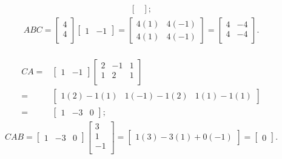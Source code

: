\documentclass[12pt]{article}
\begin{document}
\begin{enumerate}
\begin{align*}
\begin{bmatrix}
      \end{bmatrix};
    \end{align*}
    \begin{align*}
      ABC =
      \begin{bmatrix}
        4\\
        4\\
      \end{bmatrix}
      \begin{bmatrix}
        1 & -1
      \end{bmatrix}
      =
      \begin{bmatrix}
        4(1) & 4(-1)\\
        4(1) & 4(-1)
      \end{bmatrix}
      =
      \begin{bmatrix}
        4 & -4\\
        4 & -4\\
      \end{bmatrix}.
    \end{align*}\\
    \begin{align*}
      CA =&
      \begin{bmatrix}
        1 & -1
      \end{bmatrix}
      \begin{bmatrix}
        2 & -1 & 1\\
        1 &  2 & 1\\
      \end{bmatrix}\\
      =&
      \begin{bmatrix}
        1(2) - 1(1) & 1(-1) - 1(2) & 1(1) - 1(1)
      \end{bmatrix}\\
      =&
      \begin{bmatrix}
        1 & -3 & 0
      \end{bmatrix};
    \end{align*}
    \begin{align*}
      CAB =
      \begin{bmatrix}
        1 & -3 & 0
      \end{bmatrix}
      \begin{bmatrix}
         3\\
         1\\
        -1\\
      \end{bmatrix}
      =
      \begin{bmatrix}
        1(3) - 3(1) + 0(-1)
      \end{bmatrix}
      =
      \begin{bmatrix}
        0
      \end{bmatrix}.
    \end{align*}
\end{enumerate}
\end{document}

